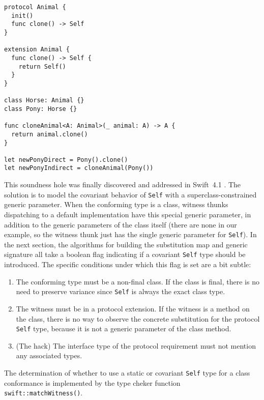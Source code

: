 \documentclass[a4paper,headsepline,bibliography=totoc,toc=flat,fleqn,twoside=semi]{scrbook}
\theoremstyle{definition}
\theoremstyle{definition}
\theoremstyle{definition}
\begin{document}
\begin{listing}\label{covariantselfexample}
\begin{Verbatim}
protocol Animal {
  init()
  func clone() -> Self
}

extension Animal {
  func clone() -> Self {
    return Self()
  }
}

class Horse: Animal {}
class Pony: Horse {}

func cloneAnimal<A: Animal>(_ animal: A) -> A {
  return animal.clone()
}

let newPonyDirect = Pony().clone()
let newPonyIndirect = cloneAnimal(Pony())
\end{Verbatim}
\end{listing}

This soundness hole was finally discovered and addressed in Swift~4.1 \cite{sr617}. The solution is to model the covariant behavior of \texttt{Self} with a superclass-constrained generic parameter. When the conforming type is a class, witness thunks dispatching to a default implementation have this special generic parameter, in addition to the generic parameters of the class itself (there are none in our example, so the witness thunk just has the single generic parameter for \texttt{Self}). In the next section, the algorithms for building the substitution map and generic signature all take a boolean flag indicating if a covariant \texttt{Self} type should be introduced. The specific conditions under which this flag is set are a bit subtle:
\begin{enumerate}
\item The conforming type must be a non-final class. If the class is final, there is no need to preserve variance since \texttt{Self} is always the exact class type.
\item The witness must be in a protocol extension. If the witness is a method on the class, there is no way to observe the concrete substitution for the protocol \texttt{Self} type, because it is not a generic parameter of the class method.
\item (The hack) The interface type of the protocol requirement must not mention any associated types.
\end{enumerate}
The determination of whether to use a static or covariant \texttt{Self} type for a class conformance is implemented by the type cheker function \texttt{swift::matchWitness()}.
\end{document}
